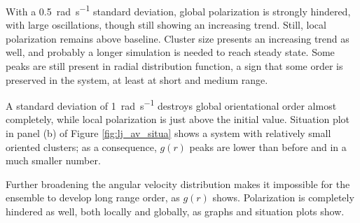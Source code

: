 \documentclass[../../master_thesis_np.tex]{subfiles}
\begin{document}
		With a \SI{0.5}{\radian\per\second} standard deviation, global polarization is strongly hindered, with large oscillations, though still showing an increasing trend.
		Still, local polarization remains above baseline.
		Cluster size presents an increasing trend as well, {\color{blue} and probably a longer simulation is needed to reach steady state}.
		Some peaks are still present in radial distribution function, a sign that some order is preserved in the system, at least at short and medium range.
		
		A standard deviation of \SI{1}{\radian\per\second} destroys global orientational order almost completely, while local polarization is just above the initial value.
		Situation plot in panel (b) of Figure \ref{fig:lj_av_situa} shows a system with relatively small oriented clusters; as a consequence, $g(r)$ peaks are lower than before and in a much smaller number.
		
		Further broadening the angular velocity distribution makes it impossible for the ensemble to develop long range order, as $g(r)$ shows.
		Polarization is completely hindered as well, both locally and globally, as graphs and situation plots show.
		
\end{document}
